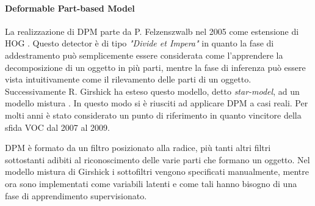 \paragraph{Deformable Part-based Model} 
La realizzazione di \ac{DPM} parte da P. Felzenszwalb nel 2005 come estensione di \ac{HOG} \cite{felzenszwalb2008discriminatively}. Questo detector è di tipo \textit{"Divide et Impera"} in quanto la fase di addestramento può semplicemente essere considerata come l'apprendere la decomposizione di un oggetto in più parti, mentre la fase di inferenza può essere vista intuitivamente come il rilevamento delle parti di un oggetto. 
Successivamente R. Girshick ha esteso questo modello, detto \textit{star-model}, ad un modello mistura \cite{felzenszwalb2010cascade, felzenszwalb2009object, girshick2011object, girshick2012rigid}. In questo modo si è riusciti ad applicare \ac{DPM} a casi reali. Per molti anni è stato considerato un punto di riferimento in quanto vincitore della sfida \ac{VOC} dal 2007 al 2009.

\ac{DPM} è formato da un filtro posizionato alla radice, più tanti altri filtri sottostanti adibiti al riconoscimento delle varie parti che formano un oggetto. Nel modello mistura di Girshick i sottofiltri vengono specificati manualmente, mentre ora sono implementati come variabili latenti e come tali hanno bisogno di una fase di apprendimento supervisionato. 
